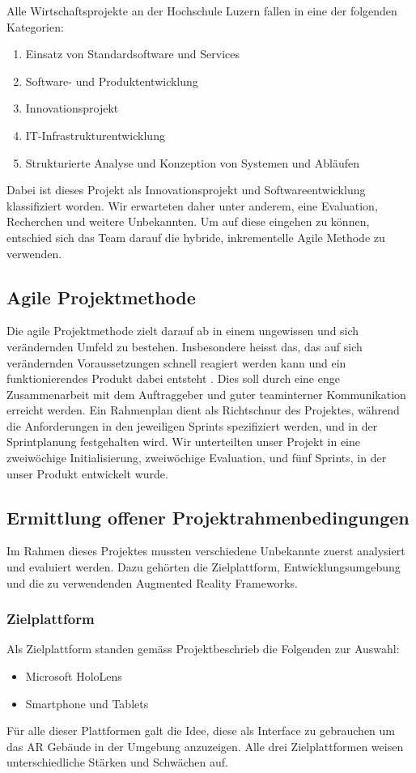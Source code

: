 \documentclass[a4paper]{scrreprt}
\begin{document}
Alle Wirtschaftsprojekte an der Hochschule Luzern fallen in eine der folgenden Kategorien:

\begin{enumerate}
	\item Einsatz von Standardsoftware und Services
	\item Software- und Produktentwicklung
	\item Innovationsprojekt
	\item IT-Infrastrukturentwicklung
	\item Strukturierte Analyse und Konzeption von Systemen und Abläufen
\end{enumerate}

Dabei ist dieses Projekt als Innovationsprojekt und Softwareentwicklung klassifiziert worden. Wir erwarteten daher unter anderem, eine Evaluation, Recherchen und weitere Unbekannten. Um auf diese eingehen zu können, entschied sich das Team darauf die hybride, inkrementelle Agile Methode zu verwenden.

\subsection{Agile Projektmethode}

Die agile Projektmethode zielt darauf ab in einem ungewissen und sich verändernden Umfeld zu bestehen. Insbesondere heisst das, das auf sich verändernden Voraussetzungen schnell reagiert werden kann und ein funktionierendes Produkt dabei entsteht \parencite{AgileAlliance2015}. Dies soll durch eine enge Zusammenarbeit mit dem Auftraggeber und guter teaminterner Kommunikation erreicht werden.
\bigbreak
Ein Rahmenplan dient als Richtschnur des Projektes, während die Anforderungen in den jeweiligen Sprints spezifiziert werden, und in der Sprintplanung festgehalten wird. Wir unterteilten unser Projekt in eine zweiwöchige Initialisierung, zweiwöchige Evaluation, und fünf Sprints, in der unser Produkt entwickelt wurde.

\subsection{Ermittlung offener Projektrahmenbedingungen}
\label{sec:evaluation}
Im Rahmen dieses Projektes mussten verschiedene Unbekannte zuerst analysiert und evaluiert werden. Dazu gehörten die Zielplattform, Entwicklungsumgebung und die zu verwendenden Augmented Reality Frameworks.
\subsubsection{Zielplattform}
Als Zielplattform standen gemäss Projektbeschrieb die Folgenden zur Auswahl:
\begin{itemize}
\item Microsoft HoloLens
\item Smartphone und Tablets
\end{itemize}
Für alle dieser Plattformen galt die Idee, diese als Interface zu gebrauchen um das AR Gebäude in der Umgebung anzuzeigen. Alle drei Zielplattformen weisen unterschiedliche Stärken und Schwächen auf.
\end{document}
